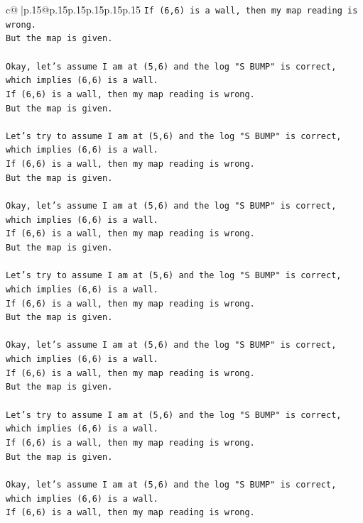 \documentclass{article}
\begin{document}
{\begin{supertabular}{c@{$\;$}|p{.15\linewidth}@{}p{.15\linewidth}p{.15\linewidth}p{.15\linewidth}p{.15\linewidth}p{.15\linewidth}}
{{{\texttt{If (6,6) is a wall, then my map reading is wrong.} \\
\texttt{But the map is given.} \\
\\ 
\texttt{Okay, let's assume I am at (5,6) and the log "S BUMP" is correct, which implies (6,6) is a wall.} \\
\texttt{If (6,6) is a wall, then my map reading is wrong.} \\
\texttt{But the map is given.} \\
\\ 
\texttt{Let's try to assume I am at (5,6) and the log "S BUMP" is correct, which implies (6,6) is a wall.} \\
\texttt{If (6,6) is a wall, then my map reading is wrong.} \\
\texttt{But the map is given.} \\
\\ 
\texttt{Okay, let's assume I am at (5,6) and the log "S BUMP" is correct, which implies (6,6) is a wall.} \\
\texttt{If (6,6) is a wall, then my map reading is wrong.} \\
\texttt{But the map is given.} \\
\\ 
\texttt{Let's try to assume I am at (5,6) and the log "S BUMP" is correct, which implies (6,6) is a wall.} \\
\texttt{If (6,6) is a wall, then my map reading is wrong.} \\
\texttt{But the map is given.} \\
\\ 
\texttt{Okay, let's assume I am at (5,6) and the log "S BUMP" is correct, which implies (6,6) is a wall.} \\
\texttt{If (6,6) is a wall, then my map reading is wrong.} \\
\texttt{But the map is given.} \\
\\ 
\texttt{Let's try to assume I am at (5,6) and the log "S BUMP" is correct, which implies (6,6) is a wall.} \\
\texttt{If (6,6) is a wall, then my map reading is wrong.} \\
\texttt{But the map is given.} \\
\\ 
\texttt{Okay, let's assume I am at (5,6) and the log "S BUMP" is correct, which implies (6,6) is a wall.} \\
\texttt{If (6,6) is a wall, then my map reading is wrong.} \\
}}}
\end{supertabular}}
\end{document}
